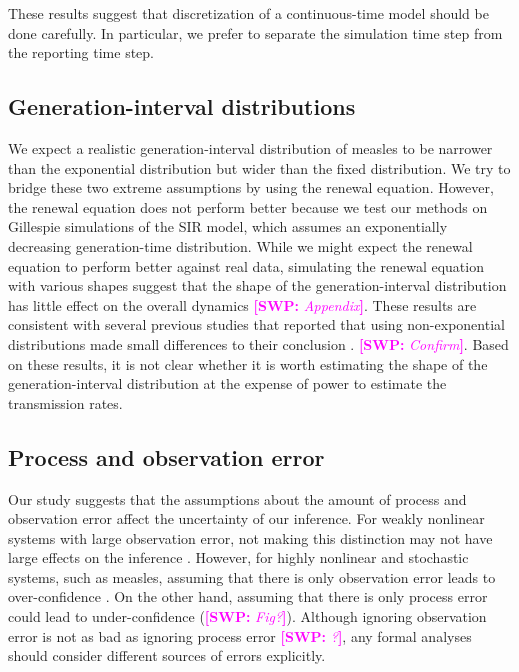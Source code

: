 \documentclass{article}
\newcommand{\comment}[3]{\textcolor{#1}{\textbf{[#2: }\textsl{#3}\textbf{]}}}
\newcommand{\swp}[1]{\comment{magenta}{SWP}{#1}}
\begin{document}
These results suggest that discretization of a continuous-time model should be done carefully.
In particular, we prefer to separate the simulation time step from the reporting time step.

\subsection{Generation-interval distributions}

We expect a realistic generation-interval distribution of measles to be narrower than the exponential distribution but wider than the fixed distribution.
We try to bridge these two extreme assumptions by using the renewal equation.
However, the renewal equation does not perform better because we test our methods on Gillespie simulations of the SIR model, which assumes an exponentially decreasing generation-time distribution.
While we might expect the renewal equation to perform better against real data, simulating the renewal equation with various shapes suggest that the shape of the generation-interval distribution has little effect on the overall dynamics \swp{Appendix}.
These results are consistent with several previous studies that reported that using non-exponential distributions made small differences to their conclusion \citep{he2009plug}. \swp{Confirm}.
Based on these results, it is not clear whether it is worth estimating the shape of the generation-interval distribution at the expense of power to estimate the transmission rates.

\subsection{Process and observation error}

Our study suggests that the assumptions about the amount of process and observation error affect the uncertainty of our inference.
For weakly nonlinear systems with large observation error, not making this distinction may not have large effects on the inference \citep{ma2014estimating}.
However, for highly nonlinear and stochastic systems, such as measles, assuming that there is only observation error leads to over-confidence \citep{king2015avoidable, taylor2016stochasticity}.
On the other hand, assuming that there is only process error could lead to under-confidence (\swp{Fig?}).
Although ignoring observation error is not as bad as ignoring process error \swp{?}, any formal analyses should consider different sources of errors explicitly.
\end{document}
